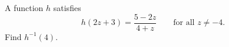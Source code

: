 A function $h$ satisfies
\[
h(2z+3)=\dfrac{5-2z}{4+z}\qquad\text{for all } z\ne-4 .
\]
Find $h^{-1}(4)$.
